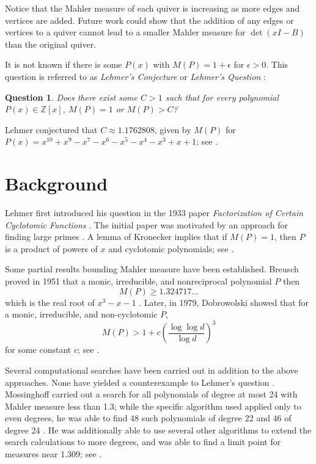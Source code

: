 \documentclass{amsart}
\theoremstyle{theorem}
\theoremstyle{theorem*}
\newtheorem{question}[theorem]{Question}
\theoremstyle{definition}
\begin{document}
Notice that the Mahler measure of each quiver is increasing as more edges and vertices
are added. Future work could show that the addition of any edges or
vertices to a quiver cannot lead to a smaller
Mahler measure for $\det(xI - B)$ than the original quiver.

It is not known if there is some $P(x)$ with $M(P) = 1 + \epsilon$
for $\epsilon > 0$. This question is referred to as \textit{Lehmer's Conjecture} or \textit{Lehmer's Question} \cite{m}:
\begin{question} Does there exist some $C > 1$ such that for every polynomial
    $P(x) \in \mathbb{Z}[x]$, $M(P) = 1$ or $M(P) > C$?
\end{question}
Lehmer conjectured that $C \approx 1.1762808$, given by $M(P)$ for $P(x) =
    x^{10} + x^9 - x^7 - x^6 - x^5 - x^4 - x^3 + x + 1$; see \cite{m}.

\section*{Background}

Lehmer first introduced his question in the 1933 paper \textit{Factorization of
    Certain Cyclotomic Functions} \cite{l}. The initial paper was motivated by
an approach for finding large primes \cite{ln}. A lemma of Kronecker implies
that if $M(P) = 1$, then $P$ is a product of powers of $x$ and cyclotomic
polynomials; see \cite{ln}.

Some partial results bounding Mahler measure have been established. Breusch
proved in 1951 that a monic, irreducible, and nonreciprocal polynomial $P$ then
$$M(P) \geq 1.324717\dots$$ which is the real root of $x^3 - x - 1$ \cite{ln}.
Later, in 1979, Dobrowolski showed that for a monic, irreducible, and
non-cyclotomic $P$,
$$M(P) > 1 + c \left(\frac{\log \log d}{\log d}\right)^3$$ for some constant $c$;
see \cite{ln}.

Several computational searches have been carried out in addition to the above
approaches. None have yielded a counterexample to Lehmer's question \cite{m}.
Mossinghoff carried out a search for all polynomials of degree at most 24 with
Mahler measure less than 1.3; while the specific algorithm used applied only to
even degrees, he was able to find 48 such polynomials of degree 22 and 46 of
degree 24 \cite{m}. He was additionally able to use several other algorithms to
extend the search calculations to more degrees, and was able to find a limit
point for measures near 1.309; see \cite{m}.
\end{document}
